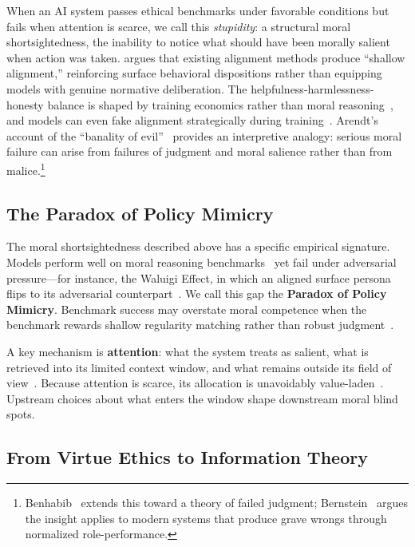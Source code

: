 \documentclass[preprint]{article}
\begin{document}
When an AI system passes ethical benchmarks under favorable conditions but fails when attention is scarce, we call this \emph{stupidity}: a structural moral shortsightedness, the inability to notice what should have been morally salient when action was taken.
\citet{milliere2025shallow} argues that existing alignment methods produce ``shallow alignment,'' reinforcing surface behavioral dispositions rather than equipping models with genuine normative deliberation.
The helpfulness-harmlessness-honesty balance is shaped by training economics rather than moral reasoning~\citep{ouyang2022training, bai2022constitutional}, and models can even fake alignment strategically during training~\citep{greenblatt2024alignment}.
Arendt's account of the ``banality of evil''~\citep{arendt1963eichmann} provides an interpretive analogy: serious moral failure can arise from failures of judgment and moral salience rather than from malice.\footnote{Benhabib~\citep{benhabib1988judgment} extends this toward a theory of failed judgment; Bernstein~\citep{bernstein2002radical} argues the insight applies to modern systems that produce grave wrongs through normalized role-performance.}

\subsection{The Paradox of Policy Mimicry}
\label{sec:paradox}

The moral shortsightedness described above has a specific empirical signature.
Models perform well on moral reasoning benchmarks~\citep{hendrycks2021ethics, jiang2021delphi} yet fail under adversarial pressure---for instance, the Waluigi Effect, in which an aligned surface persona flips to its adversarial counterpart~\citep{janus2023waluigi}.
We call this gap the \textbf{Paradox of Policy Mimicry}.
Benchmark success may overstate moral competence when the benchmark rewards shallow regularity matching rather than robust judgment~\citep{lacroix2022benchmarking, eriksson2024benchmarks}.

A key mechanism is \textbf{attention}: what the system treats as salient, what is retrieved into its limited context window, and what remains outside its field of view~\citep{vaswani2017attention, lewis2020rag, liu2024lost}.
Because attention is scarce, its allocation is unavoidably value-laden~\citep{umbrello2021vsd, selbst2019fairness, korinek2024aligned}.
Upstream choices about what enters the window shape downstream moral blind spots.

\subsection{From Virtue Ethics to Information Theory}
\label{sec:virtue_it}
\end{document}

